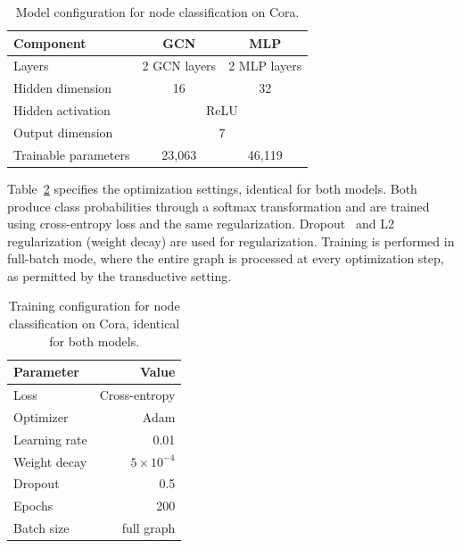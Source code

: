 \begin{table}
  \caption[Model configuration, node classification.]{%
    Model configuration for node classification on Cora.
  }
  \label{tab:gcn-model}
  \begin{center}
    \small
    \begin{tabular}{lcc}
      \toprule
      Component            & GCN               & MLP \\
      \midrule
      Layers               & 2 GCN layers & 2 MLP layers \\
      Hidden dimension     & 16                & 32 \\
      Hidden activation        &\multicolumn{2}{c}{ReLU} \\      
      Output dimension       &\multicolumn{2}{c}{7} \\
      Trainable parameters & 23{,}063          & 46{,}119 \\
      \bottomrule
    \end{tabular}
  \end{center}
\end{table}

Table~\ref{tab:gcn-training} specifies the optimization settings, identical for
both models. Both produce class probabilities through a softmax transformation
and are trained using cross-entropy loss and the same
regularization. Dropout~\cite[-2pc]{srivastava2014} and
L2 regularization (weight decay) are used for regularization.
Training is performed in full-batch mode, where the entire graph is processed
at every optimization step, as permitted by the transductive setting.

\begin{table}
  \caption[Training configuration, node classification.]{%
    Training configuration for node classification on Cora, identical for
    both models.
  }
  \label{tab:gcn-training}
  \begin{center}
    \small
    \begin{tabular}{lr}
      \toprule
      Parameter     & Value \\
      \midrule
      Loss             & Cross-entropy \\
      Optimizer     & Adam \\
      Learning rate & 0.01 \\
      Weight decay  & $5 \times 10^{-4}$ \\
      Dropout       & 0.5 \\
      Epochs        & 200 \\
      Batch size    & full graph \\
      \bottomrule
    \end{tabular}
  \end{center}
\end{table}

